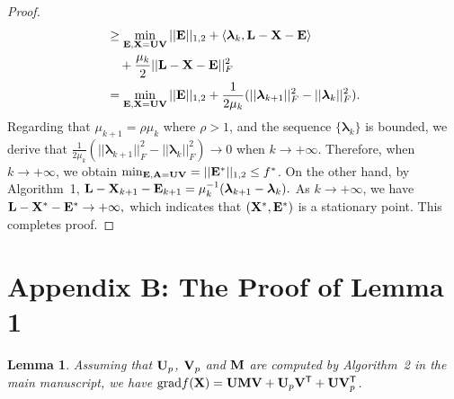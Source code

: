\documentclass[letterpaper]{article}
\newtheorem{lemma}{Lemma}
\def\U{{\bf U}}
\def\V{{\bf V}}
\def\trsp{{\sf T}}
\def\bA{{\bf A}}
\def\bM{{\bf M}}
\def\bE{{\bf E}}
\def\blambda{{\bm \lambda}}
\def\bL{{\bf L}}
\def\bU{{\bf U}}
\def\bV{{\bf V}}
\def\bX{{\bf X}}
\def\bA{{\bf A}}
\def\bX{{\bf X}}
\begin{document}
\begin{proof}
\begin{align}
          & \geq \min_{\bE, \bX = \bU \bV} || \bE ||_{1,2} + \langle \blambda_k, \bL - \bX - \bE \rangle \nonumber \\
          & \quad + \frac{\mu_k}{2} ||  \bL - \bX - \bE ||_F^2     \nonumber \\
          & = \min_{\bE, \bX = \bU \bV} || \bE ||_{1,2} + \frac{1}{2\mu_k} (|| \blambda_{k+1} ||_F^2 - || \blambda_{k} ||_F^2)   .
    \end{align}
    \indent
    Regarding that $\mu_{k+1} = \rho \mu_{k}$ where $\rho > 1$, and the sequence $\{ \blambda_k \}$ is bounded, we derive that
    $\frac{1}{2\mu_k} (|| \blambda_{k+1} ||_F^2 - || \blambda_{k} ||_F^2) \rightarrow 0$ when $k \rightarrow +\infty .$
    Therefore, when $k \rightarrow +\infty$, we obtain $\min_{\bE, \bA = \bU \bV} = || \bE^* ||_{1,2} \leq f^*$.
    On the other hand, by Algorithm~1, $\bL - \bX_{k+1} - \bE_{k+1} = \mu_k^{-1} (\blambda_{k+1} - \blambda_{k}) .$
    As $k \rightarrow +\infty$, we have $\bL - \bX^* - \bE^* \rightarrow +\infty  ,$
    which indicates that $(\bX^*, \bE^*)$ is a stationary point.
    This completes proof.
\end{proof}



\iffalse

\section{Appendix B: The Proof of Lemma 1}

\begin{lemma}
  Assuming that $\U_{p}$, $\V_{p}$ and $\bM$ are computed by Algorithm~2 in the main manuscript,
  we have ${\textnormal{grad}} f(\bX) = \U \bM \V + \U_{p} \V^{\trsp} + \U \V^{\trsp}_{p}$.
\end{lemma}
\end{document}

